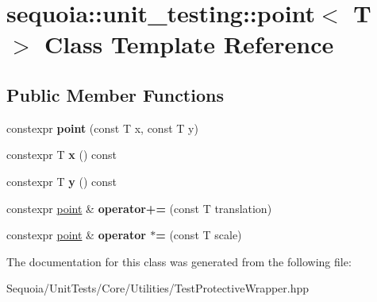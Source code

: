 \hypertarget{classsequoia_1_1unit__testing_1_1point}{}\section{sequoia\+::unit\+\_\+testing\+::point$<$ T $>$ Class Template Reference}
\label{classsequoia_1_1unit__testing_1_1point}
\subsection*{Public Member Functions}
\begin{DoxyCompactItemize}
\item 
\mbox{\label{classsequoia_1_1unit__testing_1_1point_a023dfeda965b7c98d578f226bc855392}} 
constexpr {\bfseries point} (const T x, const T y)
\item 
\mbox{\label{classsequoia_1_1unit__testing_1_1point_a92179ae81baab29becddd3dfd6dbadc5}} 
constexpr T {\bfseries x} () const
\item 
\mbox{\label{classsequoia_1_1unit__testing_1_1point_a3df964cfb75d0748fb7405c4a65f6288}} 
constexpr T {\bfseries y} () const
\item 
\mbox{\label{classsequoia_1_1unit__testing_1_1point_a37e419b642dfc5638683b84a33a8ea8b}} 
constexpr \mbox{\hyperlink{classsequoia_1_1unit__testing_1_1point}{point}} \& {\bfseries operator+=} (const T translation)
\item 
\mbox{\label{classsequoia_1_1unit__testing_1_1point_a3376a0d08339d50794644da9db72cf41}} 
constexpr \mbox{\hyperlink{classsequoia_1_1unit__testing_1_1point}{point}} \& {\bfseries operator $\ast$=} (const T scale)
\end{DoxyCompactItemize}


The documentation for this class was generated from the following file\+:\begin{DoxyCompactItemize}
\item 
Sequoia/\+Unit\+Tests/\+Core/\+Utilities/Test\+Protective\+Wrapper.\+hpp\end{DoxyCompactItemize}
